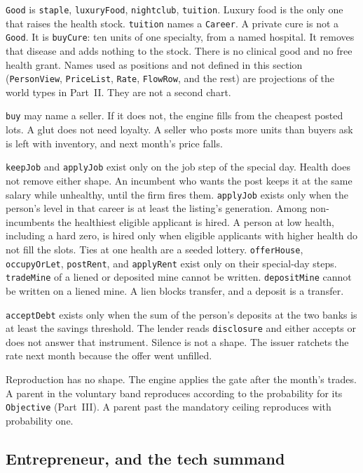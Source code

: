 \documentclass[11pt]{article}
\begin{document}
\texttt{Good} is \texttt{staple}, \texttt{luxuryFood}, \texttt{nightclub},
\texttt{tuition}. Luxury food is the only one that raises the health stock.
\texttt{tuition} names a \texttt{Career}. A private cure is not a \texttt{Good}.
It is \texttt{buyCure}: ten units of one specialty, from a named hospital.
It removes that disease and adds nothing to the stock. There is no clinical
good and no free health grant. Names used as positions and not defined in
this section (\texttt{PersonView}, \texttt{PriceList}, \texttt{Rate},
\texttt{FlowRow}, and the rest) are projections of the world types in
Part~II. They are not a second chart.

\texttt{buy} may name a seller. If it does not, the engine fills from the
cheapest posted lots. A glut does not need loyalty. A seller who posts more
units than buyers ask is left with inventory, and next month's price falls.

\texttt{keepJob} and \texttt{applyJob} exist only on the job step of the
special day. Health does not remove either shape. An incumbent who wants the
post keeps it at the same salary while unhealthy, until the firm fires them.
\texttt{applyJob} exists only when the person's level in that career is at
least the listing's generation. Among non-incumbents the healthiest eligible
applicant is hired. A person at low health, including a hard zero, is hired
only when eligible applicants with higher health do not fill the slots.
Ties at one health are a seeded lottery. \texttt{offerHouse},
\texttt{occupyOrLet}, \texttt{postRent}, and \texttt{applyRent} exist only on
their special-day steps. \texttt{tradeMine} of a liened or deposited mine
cannot be written. \texttt{depositMine} cannot be written on a liened mine.
A lien blocks transfer, and a deposit is a transfer.

\texttt{acceptDebt} exists only when the sum of the person's deposits at the
two banks is at least the savings threshold. The lender reads \texttt{disclosure} and either
accepts or does not answer that instrument. Silence is not a shape. The
issuer ratchets the rate next month because the offer went unfilled.

Reproduction has no shape. The engine applies the gate after the month's
trades. A parent in the voluntary band reproduces according to the
probability for its \texttt{Objective} (Part~III). A parent past the
mandatory ceiling reproduces with probability one.

\subsection{Entrepreneur, and the tech summand}
\end{document}
